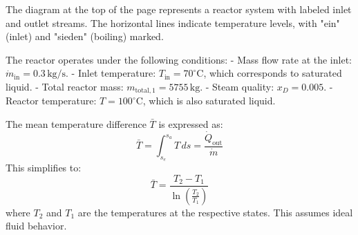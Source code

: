The diagram at the top of the page represents a reactor system with labeled inlet and outlet streams. The horizontal lines indicate temperature levels, with "ein" (inlet) and "sieden" (boiling) marked.  

The reactor operates under the following conditions:  
- Mass flow rate at the inlet: \( \dot{m}_{\text{in}} = 0.3 \, \text{kg/s} \).  
- Inlet temperature: \( T_{\text{in}} = 70^\circ\text{C} \), which corresponds to saturated liquid.  
- Total reactor mass: \( m_{\text{total},1} = 5755 \, \text{kg} \).  
- Steam quality: \( x_D = 0.005 \).  
- Reactor temperature: \( T = 100^\circ\text{C} \), which is also saturated liquid.

The mean temperature difference \( \bar{T} \) is expressed as:  
\[
\bar{T} = \int_{s_e}^{s_a} T \, ds = \frac{\dot{Q}_{\text{out}}}{\dot{m}}
\]  
This simplifies to:  
\[
\bar{T} = \frac{T_2 - T_1}{\ln\left(\frac{T_2}{T_1}\right)}
\]  
where \( T_2 \) and \( T_1 \) are the temperatures at the respective states. This assumes ideal fluid behavior.